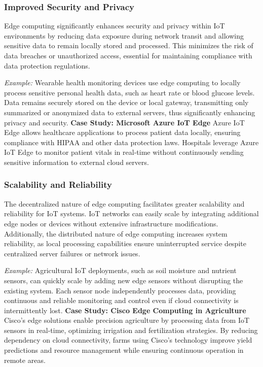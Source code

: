 \documentclass[runningheads]{llncs}
\begin{document}
\subsubsection{Improved Security and Privacy}
Edge computing significantly enhances security and privacy within IoT environments by reducing data exposure during network transit and allowing sensitive data to remain locally stored and processed. This minimizes the risk of data breaches or unauthorized access, essential for maintaining compliance with data protection regulations.

\noindent\textit{Example:} Wearable health monitoring devices use edge computing to locally process sensitive personal health data, such as heart rate or blood glucose levels. Data remains securely stored on the device or local gateway, transmitting only summarized or anonymized data to external servers, thus significantly enhancing privacy and security.
\noindent\textbf{Case Study: Microsoft Azure IoT Edge}
Azure IoT Edge allows healthcare applications to process patient data locally, ensuring compliance with HIPAA and other data protection laws. Hospitals leverage Azure IoT Edge to monitor patient vitals in real-time without continuously sending sensitive information to external cloud servers.
\subsubsection{Scalability and Reliability}
The decentralized nature of edge computing facilitates greater scalability and reliability for IoT systems. IoT networks can easily scale by integrating additional edge nodes or devices without extensive infrastructure modifications. Additionally, the distributed nature of edge computing increases system reliability, as local processing capabilities ensure uninterrupted service despite centralized server failures or network issues.

\noindent\textit{Example:} Agricultural IoT deployments, such as soil moisture and nutrient sensors, can quickly scale by adding new edge sensors without disrupting the existing system. Each sensor node independently processes data, providing continuous and reliable monitoring and control even if cloud connectivity is intermittently lost.
\noindent\textbf{Case Study: Cisco Edge Computing in Agriculture}
Cisco’s edge solutions enable precision agriculture by processing data from IoT sensors in real-time, optimizing irrigation and fertilization strategies. By reducing dependency on cloud connectivity, farms using Cisco’s technology improve yield predictions and resource management while ensuring continuous operation in remote areas.
\end{document}
